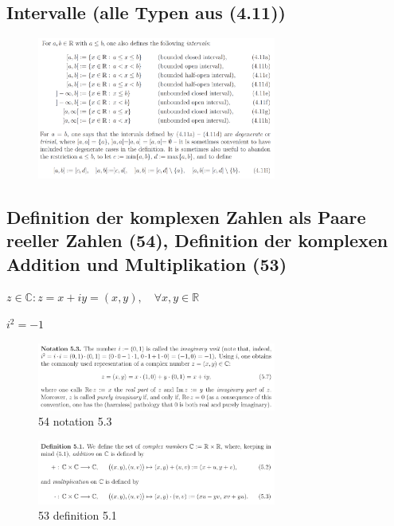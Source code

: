 \subsection{Intervalle (alle Typen aus (4.11))}

\begin{figure}[H] \centering
\includegraphics[width=0.7\textwidth]{media/4-1.png}
\end{figure}

\subsection{Definition der komplexen Zahlen als Paare reeller Zahlen (54), Definition der komplexen Addition und Multiplikation (53)}
$z \in \mathbb{C}:z=x+iy=(x,y), \quad \forall x,y \in \mathbb{R}$

$i^2=-1$

\begin{figure}[H]
	\centering
  \includegraphics[width=0.7\textwidth]{media/54-notation-5-3.png}
	\caption{54 notation 5.3}
	\label{54_notation_5.3}
\end{figure}

\begin{figure}[H]
	\centering
  \includegraphics[width=0.7\textwidth]{media/53-definition-5-1.png}
	\caption{53 definition 5.1}
	\label{53_definition_5.1}
\end{figure}


